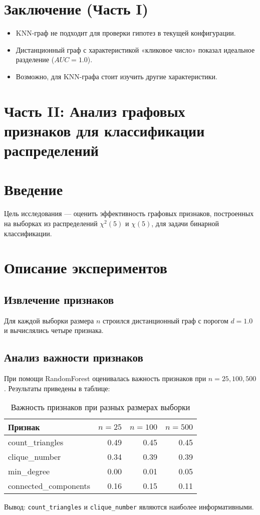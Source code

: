 \documentclass[a4paper, 12pt]{article}
\begin{document}
\section*{Заключение (Часть I)}
\begin{itemize}
    \item KNN-граф не подходит для проверки гипотез в текущей конфигурации.
    \item Дистанционный граф с характеристикой «кликовое число» показал идеальное разделение (\(AUC = 1.0\)).
    \item Возможно, для KNN-графа стоит изучить другие характеристики.
\end{itemize}

\newpage

\section*{Часть II: Анализ графовых признаков для классификации распределений}

\section{Введение}
Цель исследования --- оценить эффективность графовых признаков, построенных на выборках из распределений $\chi^2(5)$ и $\chi(5)$, для задачи бинарной классификации.

\section{Описание экспериментов}
\subsection{Извлечение признаков}
Для каждой выборки размера $n$ строился дистанционный граф с порогом $d=1.0$ и вычислялись четыре признака.

\subsection{Анализ важности признаков}
При помощи RandomForest оценивалась важность признаков при $n=25,100,500$. Результаты приведены в таблице:
\begin{table}[H]
\centering
\begin{tabular}{lrrr}
\toprule
Признак & $n=25$ & $n=100$ & $n=500$ \\
\midrule
count\_triangles       & 0.49 & 0.45 & 0.45 \\
clique\_number         & 0.34 & 0.39 & 0.39 \\
min\_degree            & 0.00 & 0.01 & 0.05 \\
connected\_components  & 0.16 & 0.15 & 0.11 \\
\bottomrule
\end{tabular}
\caption{Важность признаков при разных размерах выборки}
\label{tab:feature_importance}
\end{table}
Вывод: \texttt{count\_triangles} и \texttt{clique\_number} являются наиболее информативными.
\end{document}
